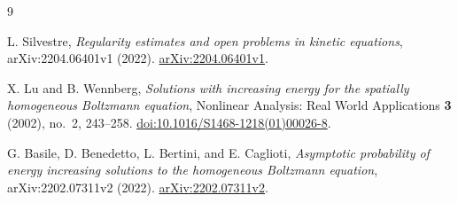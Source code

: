 \documentclass[11pt,a4paper]{article}
\numberwithin{equation}{section}
\theoremstyle{remark}
\begin{document}
\begin{thebibliography}{9}
\raggedright
{}
L. Silvestre, \emph{Regularity estimates and open problems in kinetic
equations}, arXiv:2204.06401v1 (2022).
\href{https://arxiv.org/abs/2204.06401v1}{arXiv:2204.06401v1}.

X. Lu and B. Wennberg, \emph{Solutions with increasing energy for the
spatially homogeneous Boltzmann equation},
Nonlinear Analysis: Real World Applications \textbf{3} (2002), no.~2,
243--258.
\href{https://doi.org/10.1016/S1468-1218(01)00026-8}
{doi:10.1016/S1468-1218(01)00026-8}.

G. Basile, D. Benedetto, L. Bertini, and E. Caglioti,
\emph{Asymptotic probability of energy increasing solutions to the
homogeneous Boltzmann equation}, arXiv:2202.07311v2 (2022).
\href{https://arxiv.org/abs/2202.07311v2}{arXiv:2202.07311v2}.
\end{thebibliography}
\end{document}

